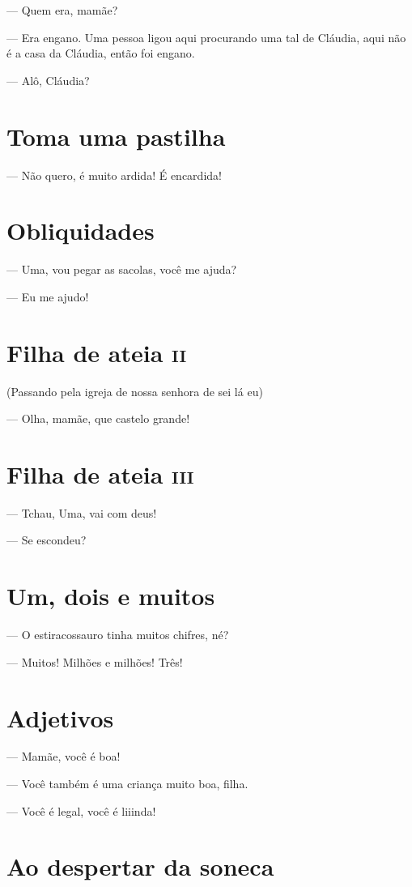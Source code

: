 {— Quem era, mamãe?

— Era engano. Uma pessoa ligou aqui procurando uma tal de Cláudia, aqui
não é a casa da Cláudia, então foi engano.

— Alô, Cláudia?

\chapter{Toma uma pastilha}

— Não quero, é muito ardida! É encardida!

\chapter{Obliquidades}

— Uma, vou pegar as sacolas, você me ajuda?

— Eu me ajudo!

\chapter{Filha de ateia \textsc{ii}}

(Passando pela igreja de nossa senhora de sei lá eu)

— Olha, mamãe, que castelo grande!

\chapter{Filha de ateia \textsc{iii}}

— Tchau, Uma, vai com deus!

— Se escondeu?

\chapter{Um, dois e muitos}

— O estiracossauro tinha muitos chifres, né?

— Muitos! Milhões e milhões! Três!

\chapter{Adjetivos}

— Mamãe, você é boa!

— Você também é uma criança muito boa, filha.

— Você é legal, você é liiinda!

\chapter{Ao despertar da soneca}

}
